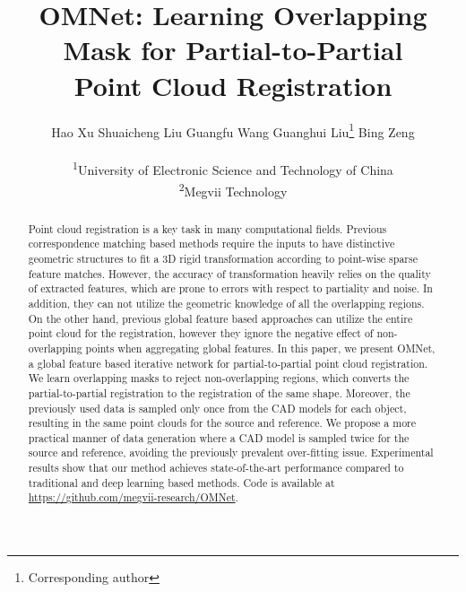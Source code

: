 \documentclass[10pt,twocolumn,letterpaper]{article}
\begin{document}
\title{OMNet: Learning Overlapping Mask for Partial-to-Partial \\Point Cloud Registration}

\author{
Hao Xu \hspace{0.5cm} 
Shuaicheng Liu \hspace{0.5cm} 
Guangfu Wang \hspace{0.5cm} 
Guanghui Liu\thanks{Corresponding author} \hspace{0.5cm} 
Bing Zeng \\
\\
\textsuperscript{1}University of Electronic Science and Technology of China \\
\textsuperscript{2}Megvii Technology \\
}


\maketitle
\ificcvfinal\thispagestyle{empty}\fi

\begin{abstract}
Point cloud registration is a key task in many computational fields. Previous correspondence matching based methods require the inputs to have distinctive geometric structures to fit a 3D rigid transformation according to point-wise sparse feature matches. However, the accuracy of transformation heavily relies on the quality of extracted features, which are prone to errors with respect to partiality and noise. In addition, they can not utilize the geometric knowledge of all the overlapping regions. On the other hand, previous global feature based approaches can utilize the entire point cloud for the registration, however they ignore the negative effect of non-overlapping points when aggregating global features. In this paper, we present OMNet, a global feature based iterative network for partial-to-partial point cloud registration. We learn overlapping masks to reject non-overlapping regions, which converts the partial-to-partial registration to the registration of the same shape. Moreover, the previously used data is sampled only once from the CAD models for each object, resulting in the same point clouds for the source and reference. We propose a more practical manner of data generation where a CAD model is sampled twice for the source and reference, avoiding the previously prevalent over-fitting issue. Experimental results show that our method achieves state-of-the-art performance compared to traditional and deep learning based methods. Code is available at \href{https://github.com/megvii-research/OMNet}{https://github.com/megvii-research/OMNet}.
\end{abstract} 
\vspace{-0.4cm}
\end{document}

